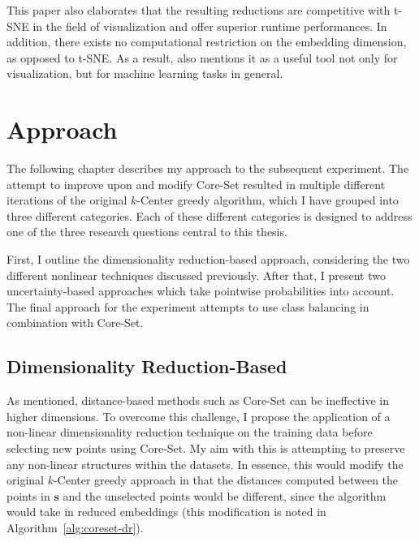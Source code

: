 \documentclass[english,bachelor,ul]{webisthesis} %
\begin{document}
This paper also elaborates that the resulting reductions are competitive with t-SNE in the field of visualization and offer superior runtime performances. In addition, there exists no computational restriction on the embedding dimension, as opposed to t-SNE. As a result, \cite{DBLP:journals/corr/abs-1802-03426} also mentions it as a useful tool not only for visualization, but for machine learning tasks in general.


\chapter{Approach}

The following chapter describes my approach to the subsequent experiment. The attempt to improve upon and modify Core-Set resulted in multiple different iterations of the original $k$-Center greedy algorithm, which I have grouped into three different categories. Each of these different categories is designed to address one of the three research questions central to this thesis. 

First, I outline the dimensionality reduction-based approach, considering the two different nonlinear techniques discussed previously. After that, I present two uncertainty-based approaches which take pointwise probabilities into account. The final approach for the experiment attempts to use class balancing in combination with Core-Set.

\section{Dimensionality Reduction-Based}

As mentioned, distance-based methods such as Core-Set can be ineffective in higher dimensions. To overcome this challenge, I propose the application of a non-linear dimensionality reduction technique on the training data before selecting new points using Core-Set. My aim with this is attempting to preserve any non-linear structures within the datasets. In essence, this would modify the original $k$-Center greedy approach in that the distances computed between the points in $ \mathbf{s} $ and the unselected points would be different, since the algorithm would take in reduced embeddings (this modification is noted in Algorithm~\ref{alg:coreset-dr}).
\end{document}

